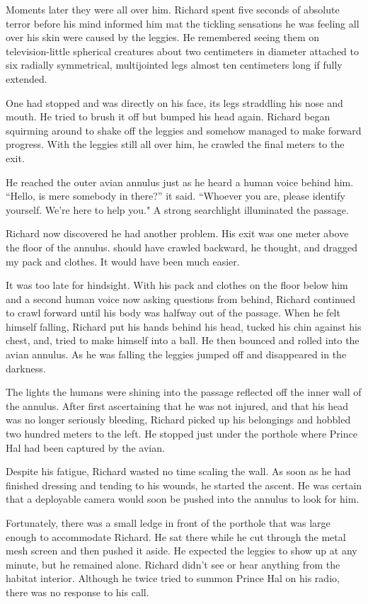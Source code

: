 \documentclass[]{article}
\begin{document}
{Moments later they were all over him.  Richard spent five seconds of absolute terror before his mind informed him mat the tickling sensations he was feeling all over his skin were caused by the leggies.  He remembered seeing them on television-little spherical creatures about two centimeters in diameter attached to six radially symmetrical, multijointed legs almost ten centimeters long if fully extended.

One had stopped and was directly on his face, its legs straddling his nose and mouth.  He tried to brush it off but bumped his head again.  Richard began squirming around to shake off the leggies and somehow managed to make forward progress.  With the leggies still all over him, he crawled the final meters to the exit.

He reached the outer avian annulus just as he heard a human voice behind him.  “Hello, is mere somebody in there?” it said.  “Whoever you are, please identify yourself.  We’re here to help you."  A strong searchlight illuminated the passage.

Richard now discovered he had another problem.  His exit was one meter above the floor of the annulus.  should have crawled backward, he thought, and dragged my pack and clothes.  It would have been much easier.

It was too late for hindsight.  With his pack and clothes on the floor below him and a second human voice now asking questions from behind, Richard continued to crawl forward until his body was halfway out of the passage.  When he felt himself falling, Richard put his hands behind his head, tucked his chin against his chest, and, tried to make himself into a ball.  He then bounced and rolled into the avian annulus.  As he was falling the leggies jumped off and disappeared in the darkness.

The lights the humans were shining into the passage reflected off the inner wall of the annulus.  After first ascertaining that he was not injured, and that his head was no longer seriously bleeding, Richard picked up his belongings and hobbled two hundred meters to the left.  He stopped just under the porthole where Prince Hal had been captured by the avian.

Despite his fatigue, Richard wasted no time scaling the wall.  As soon as he had finished dressing and tending to his wounds, he started the ascent.  He was certain that a deployable camera would soon be pushed into the annulus to look for him.

Fortunately, there was a small ledge in front of the porthole that was large enough to accommodate Richard.  He sat there while he cut through the metal mesh screen and then pushed it aside.  He expected the leggies to show up at any minute, but he remained alone.  Richard didn’t see or hear anything from the habitat interior.  Although he twice tried to summon Prince Hal on his radio, there was no response to his call.

}
\end{document}
